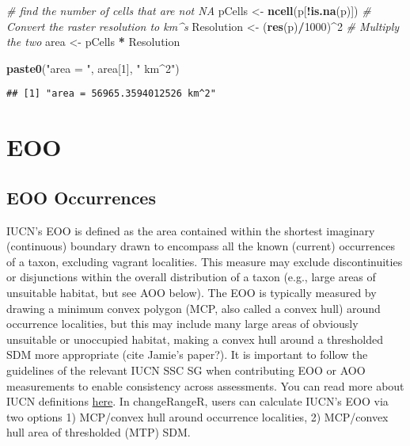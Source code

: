 \documentclass[
]{article}
\newenvironment{Shaded}{\begin{snugshade}}{\end{snugshade}}
\newcommand{\CommentTok}[1]{\textcolor[rgb]{0.56,0.35,0.01}{\textit{#1}}}
\newcommand{\DecValTok}[1]{\textcolor[rgb]{0.00,0.00,0.81}{#1}}
\newcommand{\KeywordTok}[1]{\textcolor[rgb]{0.13,0.29,0.53}{\textbf{#1}}}
\newcommand{\NormalTok}[1]{#1}
\newcommand{\OperatorTok}[1]{\textcolor[rgb]{0.81,0.36,0.00}{\textbf{#1}}}
\newcommand{\StringTok}[1]{\textcolor[rgb]{0.31,0.60,0.02}{#1}}
\begin{document}
\begin{Shaded}
\begin{Highlighting}[]
\CommentTok{# find the number of cells that are not NA}
\NormalTok{pCells <-}\StringTok{ }\KeywordTok{ncell}\NormalTok{(p[}\OperatorTok{!}\KeywordTok{is.na}\NormalTok{(p)])}
\CommentTok{# Convert the raster resolution to km^s}
\NormalTok{Resolution <-}\StringTok{ }\NormalTok{(}\KeywordTok{res}\NormalTok{(p)}\OperatorTok{/}\DecValTok{1000}\NormalTok{)}\OperatorTok{^}\DecValTok{2}
\CommentTok{# Multiply the two}
\NormalTok{area <-}\StringTok{ }\NormalTok{pCells }\OperatorTok{*}\StringTok{ }\NormalTok{Resolution}

\KeywordTok{paste0}\NormalTok{(}\StringTok{"area = "}\NormalTok{, area[}\DecValTok{1}\NormalTok{], }\StringTok{" km^2"}\NormalTok{)}
\end{Highlighting}
\end{Shaded}

\begin{verbatim}
## [1] "area = 56965.3594012526 km^2"
\end{verbatim}

\hypertarget{eoo}{%
\section{EOO}\label{eoo}}

\hypertarget{eoo-occurrences}{%
\subsection{EOO Occurrences}\label{eoo-occurrences}}

IUCN's EOO is defined as the area contained within the shortest
imaginary (continuous) boundary drawn to encompass all the known
(current) occurrences of a taxon, excluding vagrant localities. This
measure may exclude discontinuities or disjunctions within the overall
distribution of a taxon (e.g., large areas of unsuitable habitat, but
see AOO below). The EOO is typically measured by drawing a minimum
convex polygon (MCP, also called a convex hull) around occurrence
localities, but this may include many large areas of obviously
unsuitable or unoccupied habitat, making a convex hull around a
thresholded SDM more appropriate (cite Jamie's paper?). It is important
to follow the guidelines of the relevant IUCN SSC SG when contributing
EOO or AOO measurements to enable consistency across assessments. You
can read more about IUCN definitions
\href{https://www.iucnredlist.org/resources/categories-and-criteria}{here}.
In changeRangeR, users can calculate IUCN's EOO via two options 1)
MCP/convex hull around occurrence localities, 2) MCP/convex hull area of
thresholded (MTP) SDM.
\end{document}
